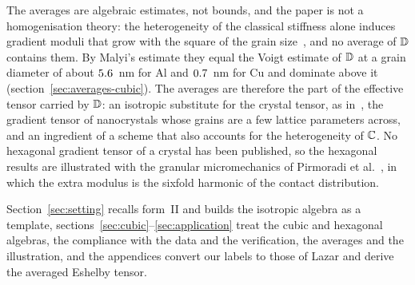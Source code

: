The averages are algebraic estimates, not bounds, and the paper is not a homogenisation
theory: the heterogeneity of the classical stiffness alone induces gradient moduli that
grow with the square of the grain size~\cite{Malyi2021}, and no average of $\mathbb{D}$ contains
them. By Malyi's estimate they equal the Voigt estimate of $\mathbb{D}$ at a grain diameter of
about $5.6$~nm for Al and $0.7$~nm for Cu
and dominate above it (section~\ref{sec:averages-cubic}). The averages are therefore the
part of the effective tensor carried by $\mathbb{D}$: an isotropic substitute for the crystal
tensor, as in~\cite[section~7]{Lazar2022}, the gradient tensor of nanocrystals whose grains
are a few lattice parameters across, and an ingredient of a scheme that also accounts for
the heterogeneity of $\mathbb{C}$. No hexagonal gradient tensor of a crystal has been published, so the hexagonal
results are illustrated with the granular micromechanics of Pirmoradi
et al.~\cite{Pirmoradi2024}, in which the extra modulus is the sixfold harmonic of the
contact distribution.

Section~\ref{sec:setting} recalls form~II and builds the isotropic algebra as a template,
sections~\ref{sec:cubic}--\ref{sec:application} treat the cubic and hexagonal algebras,
the compliance with the data and the verification, the averages and the illustration,
and the appendices convert our labels to those of Lazar and derive the averaged Eshelby
tensor.

